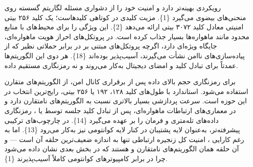 \documentclass[a4paper,14pt]{extreport}
\begin{document}
 رویکردی بهینه‌تر دارد و امنیت خود را از دشواری مسئله لگاریتم گسسته روی منحنی‌های بیضوی  می‌گیرد \{1\}. مزیت کلیدی  در کوتاهی کلیدهاست؛ یک کلید ۲۵۶ بیتی  امنیتی معادل کلید ۳۰۷۲ بیتی  ارائه می‌دهد \{2\}. این ویژگی  را برای محیط‌های با منابع محدود مانند ماهواره‌ها بسیار جذاب کرده است. در پروتکل‌های احراز هویت ماهواره‌ای،  جایگاه ویژه‌ای دارد، اگرچه پروتکل‌های مبتنی بر  در برابر حملاتی نظیر  که از پیاده‌سازی‌های ناامن نشأت می‌گیرند، آسیب‌پذیر بوده‌اند \{18\}. هر دوی این الگوریتم‌ها عمدتاً برای تبادل کلید  و امضای دیجیتال  به‌کار می‌روند و نه رمزنگاری مستقیم داده.

برای رمزنگاری حجم بالای داده پس از برقراری کانال امن، از الگوریتم‌های متقارن استفاده می‌شود. استاندارد  با طول‌های کلید ۱۲۸، ۱۹۲ یا ۲۵۶ بیتی، رایج‌ترین انتخاب در این حوزه است.  سرعت پردازشی بسیار بالاتری نسبت به الگوریتم‌های نامتقارن دارد و در معماری‌های ارتباطات ماهواره‌ای، پس از تبادل کلید جلسه  توسط  یا ، رمزنگاری داده‌های تله‌متری و فرمان را بر عهده می‌گیرد \{14\}. در چارچوب‌های ترکیبی پیشرفته‌تر،  به‌عنوان لایه پشتیبان در کنار لایه کوانتومی نیز به‌کار می‌رود \{13\}. اما به رغم کارایی ، امنیت کل زنجیره ارتباطی تنها به اندازه ضعیف‌ترین حلقه آن است — و آن حلقه همان الگوریتم‌های نامتقارن  و  هستند که در بخش بعدی نشان داده می‌شود چرا در برابر کامپیوترهای کوانتومی کاملاً آسیب‌پذیرند \{1\}.
\end{document}

